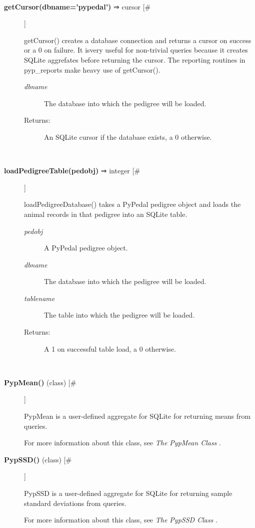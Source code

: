 \begin{description}
\begin{description}
\end{description}
\\ 

\item[\textbf{getCursor(dbname='pypedal')}
 ⇒ cursor [\#]]

 getCursor() creates a database connection and returns a cursor on success or a 0 on failure. It isvery useful for non-trivial queries because it creates SQLite aggrefates before returning the cursor. The reporting routines in pyp\_reports make heavy use of getCursor().
\begin{description}
\item[\emph{dbname}
] The database into which the pedigree will be loaded.
\item[Returns:] An SQLite cursor if the database exists, a 0 otherwise.

\end{description}
\\ 

\item[\textbf{loadPedigreeTable(pedobj)}
 ⇒ integer [\#]]

 loadPedigreeDatabase() takes a PyPedal pedigree object and loads the animal records in that pedigree into an SQLite table.
\begin{description}
\item[\emph{pedobj}
] A PyPedal pedigree object.
\item[\emph{dbname}
] The database into which the pedigree will be loaded.
\item[\emph{tablename}
] The table into which the pedigree will be loaded.
\item[Returns:] A 1 on successful table load, a 0 otherwise.

\end{description}
\\ 

\item[\textbf{PypMean()}
 (class) [\#]]

 PypMean is a user-defined aggregate for SQLite for returning means from queries.


 For more information about this class, see \emph{The PypMean Class}
.

\item[\textbf{PypSSD()}
 (class) [\#]]

 PypSSD is a user-defined aggregate for SQLite for returning sample standard deviations from queries.


 For more information about this class, see \emph{The PypSSD Class}
.


\end{description}
